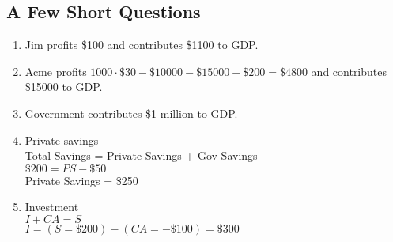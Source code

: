 \documentclass{pset}
\begin{document}
\subsection{A Few Short Questions}
\begin{enumerate}
\item Jim profits \$100 and contributes \$1100 to GDP.\@
\item Acme profits \( 1000 \cdot \$30-\$10000-\$15000-\$200 = \$4800\) and contributes \$15000 to GDP.\@
\item Government contributes \$1 million to GDP.\@
\item Private savings {\color{red}
    \\Total Savings = Private Savings + Gov Savings
    \\\( \$200 = PS - \$50 \)
    \\Private Savings = \$250
    }
  \item Investment {\color{red}
      \\\( I + CA = S\)
      \\\( I = (S = \$200) - (CA = -\$100) = \$300 \)
      }
\end{enumerate}
\end{document}
